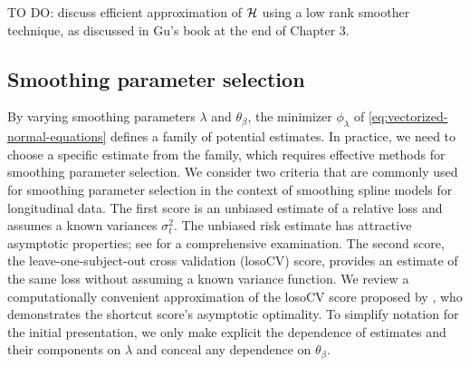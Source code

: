 
\bigskip
TO DO: discuss efficient approximation of $\mathcal{H}$ using a low rank smoother technique, as discussed in Gu's book at the end of Chapter 3. \cite{kim2004smoothing}


\subsection{Smoothing parameter selection}
%
%

By varying smoothing parameters $\lambda$ and $\theta_\beta$, the minimizer $\phi_\lambda$ of \ref{eq:vectorized-normal-equations} defines a family of potential estimates. In practice, we need to choose a specific estimate from the family, which requires effective methods for smoothing parameter selection. We consider two criteria that are commonly used for smoothing parameter selection in the context of smoothing spline models for longitudinal data. The first score is an unbiased estimate of a relative loss and assumes a known variances $\sigma_t^2$. The unbiased risk estimate has attractive asymptotic properties; see \cite{gu2013smoothing} for a comprehensive examination. The second score, the leave-one-subject-out cross validation (losoCV) score, provides an estimate of the same loss without assuming a known variance function. We review a computationally convenient approximation of the losoCV score proposed by \cite{xu2012asymptotic}, who demonstrates the shortcut score's asymptotic optimality. To simplify notation for the initial presentation, we only make explicit the dependence of estimates and their components on $\lambda$ and conceal any dependence on $\theta_\beta$. 


